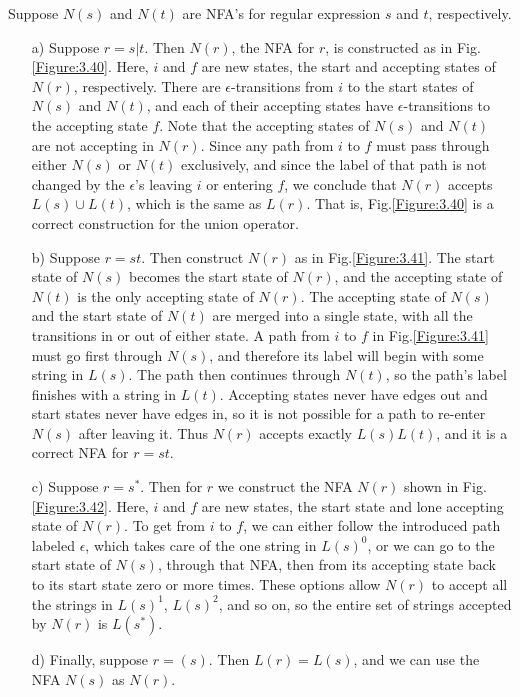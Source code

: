 \documentclass[a4paper,twoside]{book}
\begin{document}
{     Suppose $N(s)$ and $N(t)$ are NFA's for regular expression $s$ and $t$, respectively.
    \begin{itemize}
        \item[a)] Suppose $r=s|t$. Then $N(r)$, the NFA for $r$, is constructed as in Fig.\;\ref{Figure:3.40}. Here, $i$ and $f$ are new states, the start and accepting states of $N(r)$, respectively. There are $\epsilon$-transitions from $i$ to the start states of $N(s)$ and $N(t)$, and each of their accepting states have $\epsilon$-transitions to the accepting state $f$. Note that the accepting states of $N(s)$ and $N(t)$ are not accepting in $N(r)$. Since any path from $i$ to $f$ must pass through either $N(s)$ or $N(t)$ exclusively, and since the label of that path is not changed by the $\epsilon$'s leaving $i$ or entering $f$, we conclude that $N(r)$ accepts $L(s)\cup L(t)$, which is the same as $L(r)$. That is, Fig.\;\ref{Figure:3.40} is a correct construction for the union operator.
        \item[b)] Suppose $r=st$. Then construct $N(r)$ as in Fig.\;\ref{Figure:3.41}. The start state of $N(s)$ becomes the start state of $N(r)$, and the accepting state of $N(t)$ is the only accepting state of $N(r)$. The accepting state of $N(s)$ and the start state of $N(t)$ are merged into a single state, with all the transitions in or out of either state. A path from $i$ to $f$ in Fig.\;\ref{Figure:3.41} must go first through $N(s)$, and therefore its label will begin with some string in $L(s)$. The path then continues through $N(t)$, so the path's label finishes with a string in $L(t)$. Accepting states never have edges out and start states never have edges in, so it is not possible for a path to re-enter $N(s)$ after leaving it. Thus $N(r)$ accepts exactly $L(s)L(t)$, and it is a correct NFA for $r=st$.
        \item[c)] Suppose $r=s^*$. Then for $r$ we construct the NFA $N(r)$ shown in Fig.\;\ref{Figure:3.42}. Here, $i$ and $f$ are new states, the start state and lone accepting state of $N(r)$. To get from $i$ to $f$, we can either follow the introduced path labeled $\epsilon$, which takes care of the one string in $L(s)^0$, or we can go to the start state of $N(s)$, through that NFA, then from its accepting state back to its start state zero or more times. These options allow $N(r)$ to accept all the strings in $L(s)^1$, $L(s)^2$, and so on, so the entire set of strings accepted by $N(r)$ is $L(s^*)$.
        \item[d)] Finally, suppose $r=(s)$. Then $L(r)=L(s)$, and we can use the NFA $N(s)$ as $N(r)$.
    \end{itemize}
}
\end{document}
